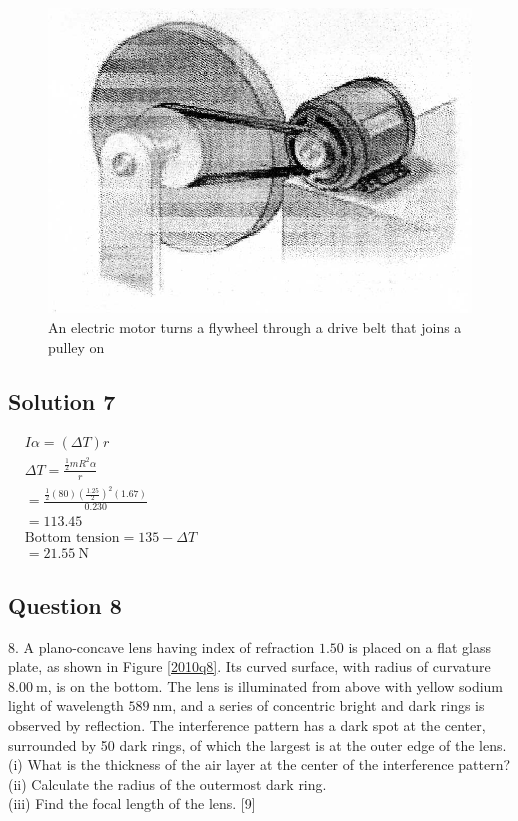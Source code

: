 \documentclass{article}
\begin{document}
\begin{figure}
	\centering
	\includegraphics[width=0.5\linewidth]{spho_book_TYS_images/2010q7.png}
	\caption{An electric motor turns a flywheel through a drive belt that joins a pulley on}\label{2010q7}
\end{figure}
\subsection{Solution 7}
$\begin{aligned}
	&I{\alpha}=(\Delta T) r\\
	&\Delta T=\frac{\frac{1}{2} m R^{2} \alpha}{r} \\
	&=\frac{\frac{1}{2}(80)\left(\frac{1.25}{2}\right)^2 (1.67)}{0.230}\\
	&=113.45\\
	&\text {Bottom tension}=135-\Delta T\\
	&=21.55 \mathrm{~N} 
\end{aligned}$

\subsection{Question 8}
8. A plano-concave lens having index of refraction $1.50$ is placed on a flat glass plate, as shown in Figure \ref{2010q8}. Its curved surface, with radius of curvature $8.00 \mathrm{~m}$, is on the bottom. The lens is illuminated from above with yellow sodium light of wavelength $589 \mathrm{~nm}$, and a series of concentric bright and dark rings is observed by reflection. The interference pattern has a dark spot at the center, surrounded by 50 dark rings, of which the largest is at the outer edge of the lens. \\
(i) What is the thickness of the air layer at the center of the interference pattern? \\
(ii) Calculate the radius of the outermost dark ring. \\
(iii) Find the focal length of the lens. [9]
\end{document}
